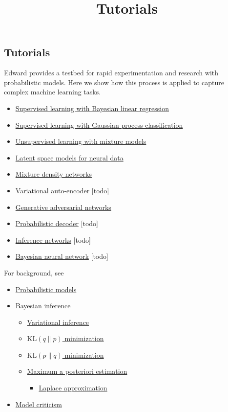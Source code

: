 \title{Tutorials}

\subsection{Tutorials}

Edward provides a testbed for rapid experimentation and research with
probabilistic models. Here we show how this process is applied to
capture complex machine learning tasks.

\begin{itemize}
  \item \href{supervised-regression}{Supervised learning with Bayesian linear regression}
  \item \href{supervised-classification}{Supervised learning with Gaussian process classification}
  \item \href{unsupervised}{Unsupervised learning with mixture models}
  \item \href{latent-space-models}{Latent space models for neural data}
  \item \href{mixture-density-network}{Mixture density networks}
  \item \href{vae}{Variational auto-encoder} [todo]
  \item \href{gan}{Generative adversarial networks}
  \item \href{decoder}{Probabilistic decoder} [todo]
  \item \href{inference-networks}{Inference networks} [todo]
  \item \href{bayesian-neural-network}{Bayesian neural network} [todo]
\end{itemize}

For background, see
\begin{itemize}
  \item \href{model}{Probabilistic models}
  \item \href{inference}{Bayesian inference}
  \begin{itemize}
   \item \href{variational-inference}{Variational inference}
   \item \href{klqp}{$\text{KL}(q\|p)$ minimization}
   \item \href{klpq}{$\text{KL}(p\|q)$ minimization}
   \item \href{map}{Maximum a posteriori estimation}
   \begin{itemize}
     \item \href{map-laplace}{Laplace approximation}
   \end{itemize}
  \end{itemize}
  \item \href{criticism}{Model criticism}
\end{itemize}

